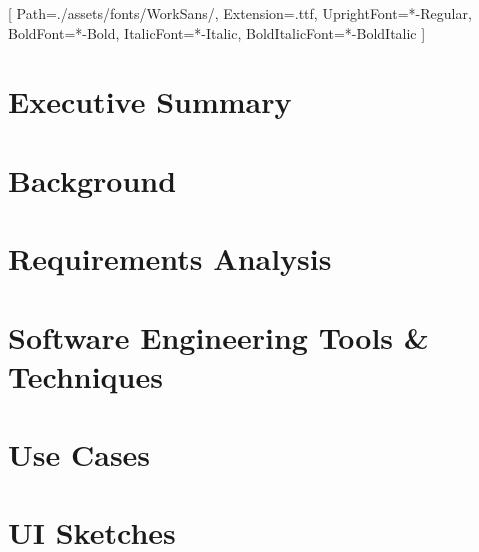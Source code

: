 

\setmainfont{WorkSans}[
    Path=./assets/fonts/WorkSans/,
    Extension=.ttf,
    UprightFont=*-Regular,
    BoldFont=*-Bold,
    ItalicFont=*-Italic,
    BoldItalicFont=*-BoldItalic
]

\setlststylejs





\newpage

\section{Executive Summary}



\section{Background}



\section{Requirements Analysis}







\section{Software Engineering Tools \& Techniques}











\appendix

\section{Use Cases}



\section{UI Sketches}




